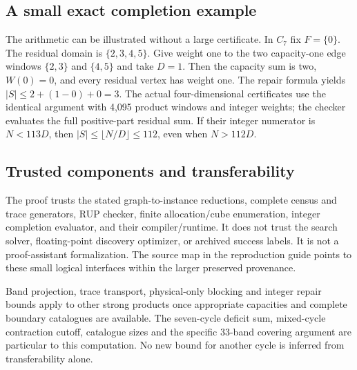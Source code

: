\documentclass[11pt]{article}
\theoremstyle{definition}
\begin{document}
\subsection{A small exact completion example}
The arithmetic can be illustrated without a large certificate. In $C_7$
fix $F=\{0\}$. The residual domain is $\{2,3,4,5\}$.
Give weight one to the two capacity-one edge windows $\{2,3\}$ and
$\{4,5\}$ and take $D=1$. Then the capacity sum is two, $W(0)=0$,
and every residual vertex has weight one. The repair formula yields
$|S|\leq2+(1-0)+0=3$. The actual four-dimensional certificates use
the identical argument with 4,095 product windows and integer weights;
the checker evaluates the full positive-part residual sum. If their
integer numerator is $N<113D$, then
$|S|\leq\lfloor N/D\rfloor\leq112$, even when $N>112D$.

\subsection{Trusted components and transferability}
The proof trusts the stated graph-to-instance reductions, complete census
and trace generators, RUP checker, finite allocation/cube enumeration,
integer completion evaluator, and their compiler/runtime. It does not
trust the search solver, floating-point discovery optimizer, or archived
success labels. It is not a proof-assistant formalization. The source map
in the reproduction guide points to these small logical interfaces within
the larger preserved provenance.

Band projection, trace transport, physical-only blocking and integer
repair bounds apply to other strong products once appropriate capacities
and complete boundary catalogues are available. The seven-cycle deficit
sum, mixed-cycle contraction cutoff, catalogue sizes and the specific
33-band covering argument are particular to this computation. No new
bound for another cycle is inferred from transferability alone.

\clearpage
\end{document}
